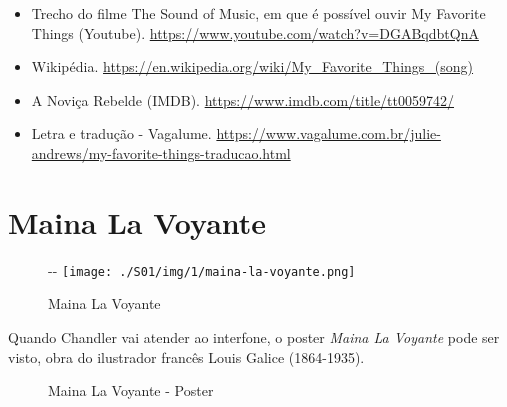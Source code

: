 \begin{itemize}
\tightlist
\item
  \sloppy Trecho do filme The Sound of Music, em que é possível ouvir My Favorite Things (Youtube). \url{https://www.youtube.com/watch?v=DGABqdbtQnA}
\item
  \sloppy Wikipédia. \url{https://en.wikipedia.org/wiki/My_Favorite_Things_(song)}
\item
  \sloppy A Noviça Rebelde (IMDB). \url{https://www.imdb.com/title/tt0059742/}
\item
  \sloppy Letra e tradução - Vagalume. \url{https://www.vagalume.com.br/julie-andrews/my-favorite-things-traducao.html}
\end{itemize}

\hypertarget{maina-la-voyante}{%
\section{Maina La Voyante}\label{maina-la-voyante}}

\begin{figure}[!ht]
  \begin{adjustwidth}{-\oddsidemargin-1in}{-\rightmargin}
    \centering
    \texttt{[image: ./S01/img/1/maina-la-voyante.png]}
    \caption{Maina La Voyante\label{fig:maina-la-voyante}}
  \end{adjustwidth}
\end{figure}

\saveparinfos
\noindent
\begin{minipage}[c]{0.5\textwidth}\useparinfo

Quando Chandler vai atender ao interfone, o poster \emph{Maina La
Voyante} pode ser visto, obra do ilustrador francês Louis Galice
(1864-1935).

\end{minipage}\hfill
\begin{minipage}[c]{0.6\textwidth}

\begin{figure}
  \centering
    \caption{Maina La Voyante - Poster\label{fig:maina-la-voyante-poster}}
\end{figure}

\end{minipage}

